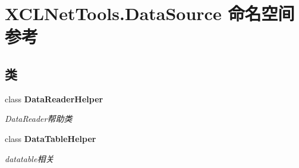 \hypertarget{namespace_x_c_l_net_tools_1_1_data_source}{}\section{X\+C\+L\+Net\+Tools.\+Data\+Source 命名空间参考}
\label{namespace_x_c_l_net_tools_1_1_data_source}
\subsection*{类}
\begin{DoxyCompactItemize}
\item 
class {\bfseries Data\+Reader\+Helper}
\begin{DoxyCompactList}\small\item\em Data\+Reader帮助类 \end{DoxyCompactList}\item 
class {\bfseries Data\+Table\+Helper}
\begin{DoxyCompactList}\small\item\em datatable相关 \end{DoxyCompactList}\end{DoxyCompactItemize}
